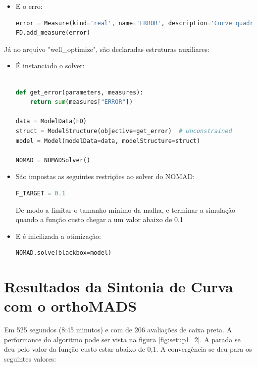 \begin{itemize}
\item E o erro:
\begin{lstlisting}[language=Python]
error = Measure(kind='real', name='ERROR', description='Curve quadratic error')
FD.add_measure(error)
\end{lstlisting}
\end{itemize}

Já no arquivo "well\_optimize", são declaradas estruturas auxiliares:
\begin{itemize}

\item É instanciado o solver:
\begin{lstlisting}[language=Python]%

def get_error(parameters, measures):
    return sum(measures["ERROR"])

data = ModelData(FD)
struct = ModelStructure(objective=get_error)  # Unconstrained
model = Model(modelData=data, modelStructure=struct)

NOMAD = NOMADSolver()

\end{lstlisting}



\item São impostas as seguintes restrições ao solver do NOMAD:
\begin{lstlisting}[language=Python]
F_TARGET = 0.1
\end{lstlisting}

De modo a limitar o tamanho mínimo da malha, e terminar a simulação quando a função custo chegar a um valor abaixo de 0.1

\item E é inicilizada a otimização:
\begin{lstlisting}[language=Python]
NOMAD.solve(blackbox=model)
\end{lstlisting}

\end{itemize}

\section{Resultados da Sintonia de Curva com o orthoMADS}

Em 525 segundos (8:45 minutos) e com de 206 avaliações de caixa preta. A performance do algoritmo pode ser vista na figura \ref{fig:setup1_2}. A parada se deu pelo valor da função custo estar abaixo de 0,1. A convergência se deu para os seguintes valores:

